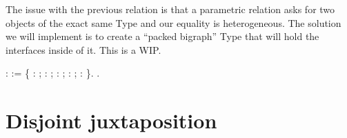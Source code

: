 \documentclass[12pt]{report}
\begin{document}
The issue with the previous relation is that a parametric relation asks for two 
objects of the exact same Type and our equality is heterogeneous. The solution we 
will implement is to create a ``packed bigraph'' Type that will hold the interfaces 
inside of it. This is a WIP. \begin{coqdoccode}
\coqdocnoindent
{}  :  :=\coqdoceol
\coqdocindent{1.00em}
\{\coqdoceol
\coqdocindent{1.00em}
: ;\coqdoceol
\coqdocindent{1.00em}
: ;\coqdoceol
\coqdocindent{1.00em}
: ;\coqdoceol
\coqdocindent{1.00em}
: ;\coqdoceol
\coqdocindent{1.00em}
 :     \coqdoceol
\coqdocindent{1.00em}
\}.\coqdoceol
\coqdocnoindent
{} .\coqdoceol
\coqdocemptyline
\end{coqdoccode}
\section{Disjoint juxtaposition}
\end{document}
